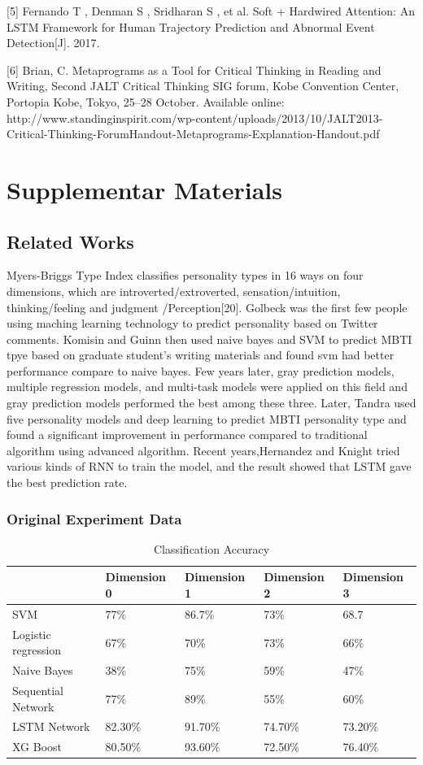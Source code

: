 \documentclass{article}
\begin{document}
[5] Fernando T , Denman S , Sridharan S , et al. Soft + Hardwired Attention: An LSTM Framework for Human Trajectory Prediction and Abnormal Event Detection[J]. 2017.

[6] Brian, C. Metaprograms as a Tool for Critical Thinking in Reading and Writing, Second JALT Critical Thinking SIG forum, Kobe Convention Center, Portopia Kobe, Tokyo, 25–28 October. Available online: http://www.standinginspirit.com/wp-content/uploads/2013/10/JALT2013-Critical-Thinking-ForumHandout-Metaprograms-Explanation-Handout.pdf 


 
 
\section{Supplementar Materials}

\subsection{Related Works}
 Myers-Briggs Type Index classifies personality types in 16 ways on four dimensions, which are introverted/extroverted,  sensation/intuition, thinking/feeling and judgment /Perception[20]. Golbeck was the first few people using maching learning technology to predict personality based on Twitter comments. Komisin and Guinn then used naive bayes and SVM to predict MBTI tpye based on graduate student's writing materials and found svm had better performance compare to naive bayes. Few years later, gray prediction models, multiple regression models, and multi-task models were applied on this field and gray prediction models performed the best among these three. Later, Tandra used five personality models and deep learning to predict MBTI personality type and found a significant improvement in performance compared to traditional algorithm using advanced algorithm. Recent years,Hernandez and Knight tried various kinds of RNN to train the model, and the result showed that LSTM gave the best prediction rate.
 
\subsubsection{Original Experiment Data}
\begin{table}[h]
	\vspace{20pt}
	\centering
	\begin{tabular}{lllll}
		\hline  
		  & Dimension 0 & Dimension 1 & Dimension 2 & Dimension 3\\
		  \hline  
		  SVM & 77\% & 86.7\% & 73\% & 68.7 \\ 
		Logistic regression & 67\% & 70\% & 73\% & 66\% \\
		Naive Bayes	& 38\%	& 75\% & 59\% &47\% \\
		Sequential Network & 77\% &	89\% & 55\% & 60\% \\
		LSTM Network & 82.30\% & 91.70\% & 74.70\% & 73.20\% \\
		XG Boost & 80.50\% & 93.60\% & 72.50\%	& 76.40\% \\
		\hline       
	\end{tabular}
	\caption{Classification Accuracy}
\label{bs}
\end{table}
\end{document}
